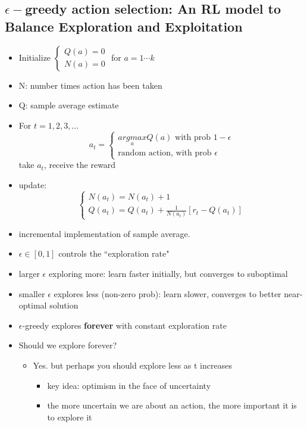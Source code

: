 \documentclass[10pt, oneside]{article}
\newcommand{\N}{\mathbb{N}}
\begin{document}
\subsection{$\epsilon-$greedy action selection: An RL model to Balance Exploration and Exploitation}
\begin{itemize}
    \item Initialize $\begin{cases}
        Q(a) = 0\\N(a) = 0
    \end{cases}$ for $a=1\cdots k$
    \item N: number times action has been taken
    \item Q: sample average estimate
    \item For $t=1,2,3,...$
    \[a_t = \begin{cases}
        \underset{a}{argmax} Q(a)\text{ with prob } 1-\epsilon\\
        \text{random action, with prob }\epsilon
    \end{cases}\]
    take $a_t$, receive the reward
    \item update:\[\begin{cases}
        N(a_t) = N(a_t) + 1\\
        Q(a_t) = Q(a_t) + \frac{1}{N(a_t)}[r_t-Q(a_t)]
    \end{cases}\]
    \item incremental implementation of sample average.
    \item $\epsilon \in [0,1]$ controls the ``exploration rate"
    \item larger $\epsilon$ exploring more: learn faster initially, but converges to suboptimal
    \item smaller $\epsilon$ explores less (non-zero prob): learn slower, converges to better near-optimal solution
    \item $\epsilon$-greedy explores \textbf{forever} with constant exploration rate
    \item Should we explore forever?
    \begin{itemize}
        \item Yes. but perhaps you should explore less as t increases
        \begin{itemize}
            \item key idea: optimism in the face of uncertainty
            \item the more uncertain we are about an action, the more important it is to explore it
        \end{itemize}
    \end{itemize}
\end{itemize}
\end{document}

